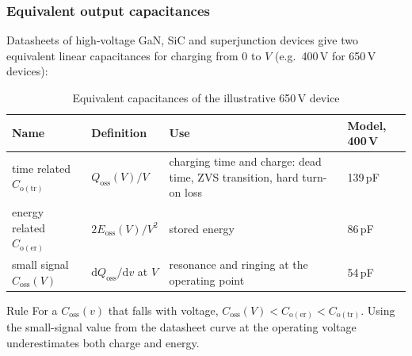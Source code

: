 \begin{frame}
	\frametitle{Equivalent output capacitances}
	Datasheets of high-voltage GaN, SiC and superjunction devices give two equivalent linear capacitances for charging from 0 to $V$ (e.g.\ 400\,V for 650\,V devices):
	\begin{table}
		\centering
		\small
		\begin{tabular}{|l|l|>{\raggedright\arraybackslash}p{5.4cm}|l|}
			\hline
			\textbf{Name}            & \textbf{Definition}                              & \textbf{Use}                                           & \textbf{Model, 400\,V} \\
			\hline
			time related $C_\mathrm{o(tr)}$   & $Q_\mathrm{oss}(V)/V$                  & charging time and charge: dead time, ZVS transition, hard turn-on loss & 139\,pF \\
			energy related $C_\mathrm{o(er)}$ & $2E_\mathrm{oss}(V)/V^2$               & stored energy                                          & 86\,pF \\
			small signal $C_\mathrm{oss}(V)$  & $\mathrm{d}Q_\mathrm{oss}/\mathrm{d}v$ at $V$ & resonance and ringing at the operating point     & 54\,pF \\
			\hline
		\end{tabular}
		\caption{Equivalent capacitances of the illustrative 650\,V device}
	\end{table}
	\begin{block}{Rule}
		For a $C_\mathrm{oss}(v)$ that falls with voltage, $C_\mathrm{oss}(V) < C_\mathrm{o(er)} < C_\mathrm{o(tr)}$. Using the small-signal value from the datasheet curve at the operating voltage underestimates both charge and energy.
	\end{block}
\end{frame}

